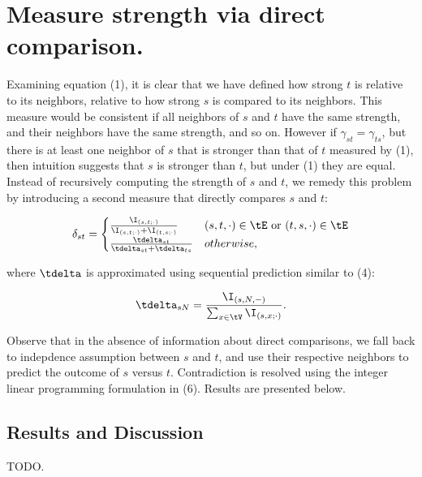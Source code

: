 \section{Measure strength via direct comparison.}

Examining equation (1), it is clear that we have defined how strong $t$ is relative to its neighbors, relative to how strong $s$ is compared to its neighbors. This measure would be consistent if all neighbors of $s$ and $t$ have the same strength, and their neighbors have the same strength, and so on. However if $\gamma_{st} = \gamma_{ts}$, but there is at least one neighbor of $s$ that is stronger than that of $t$ measured by (1), then intuition suggests that $s$ is stronger than $t$, but under (1) they are equal. Instead of recursively computing the strength of $s$ and $t$, we remedy this problem by introducing a second measure that directly compares $s$ and $t$:

\begin{equation}
	\delta_{st} = \begin{cases} 
		\frac{\I_{(s,t; \cdot)}}{\I_{(s,t; \cdot)} + \I_{(t,s; \cdot)}} & (s,t,\cdot) \in \tE \text{ or } (t,s,\cdot) \in \tE \\ 
		\frac{\tdelta_{st}}{\tdelta_{st} + \tdelta_{ts}} & otherwise,
	\end{cases}
\end{equation}

where $\tdelta$ is approximated using sequential prediction similar to (4):

\begin{equation}
	\tdelta_{sN} = \frac{\I_{(s,N,-)}}{\sum_{x \in \tV} \I_{(s,x; \cdot)}}.
\end{equation}

Observe that in the absence of information about direct comparisons, we fall back to indepdence assumption between $s$ and $t$, and use their respective neighbors to predict the outcome of $s$ versus $t$. Contradiction is resolved using the integer linear programming formulation in (6). Results are presented below.


\subsection{Results and Discussion}

TODO.



	











































